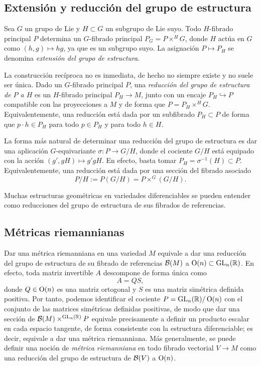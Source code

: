 \documentclass[11pt,a4paper]{amsbook}
\theoremstyle{remark} \newtheorem{rmk}[subsection]{Observación}
\theoremstyle{definition} \newtheorem{defn}[subsection]{Definición}
\theoremstyle{definition} \newtheorem{ex}[subsection]{Ejemplo}
\theoremstyle{definition} \newtheorem{ej}[subsection]{Ejercicio}
\begin{document}
\subsection{Extensión y reducción del grupo de estructura} Sea $G$ un grupo de Lie y $H\subset G$ un subgrupo de Lie suyo. Todo $H$-fibrado principal $P$ determina un $G$-fibrado principal $P_G=P\times^H G$, donde $H$ actúa en $G$ como $(h,g)\mapsto hg$, ya que es un subgrupo suyo. La asignación $P\mapsto P_H$ se denomina \emph{extensión del grupo de estructura}.

La construcción recíproca no es inmediata, de hecho no siempre existe y no suele ser única. Dado un $G$-fibrado principal $P$, una \emph{reducción del grupo de estructura de $P$ a $H$} es un $H$-fibrado principal $P_H\rightarrow M$, junto con un encaje $P_H\hookrightarrow P$ compatible con las proyecciones a $M$ y de forma que $P=P_H\times^H G$.
Equivalentemente, una reducción está dada por un subfibrado $P_H\subset P$ de forma que $p\cdot h \in P_H$ para todo $p\in P_H$ y para todo $h\in H$.

La forma más natural de determinar una reducción del grupo de estructura es dar una aplicación $G$-equivariante $\sigma: P \rightarrow G/H$, donde el cociente $G/H$ está equipado con la acción $(g', gH) \mapsto g'gH$. En efecto, basta tomar $P_H=\sigma^{-1}(H)\subset P$. Equivalentemente, una reducción está dada por una sección del fibrado asociado
\begin{equation*}
P/H := P(G/H) = P\times^G (G/H).
\end{equation*}


Muchas estructuras geométricas en variedades diferenciables se pueden entender como reducciones del grupo de estructura de sus fibrados de referencias.
\subsection{Métricas riemannianas} Dar una métrica riemanniana en una variedad $M$ equivale a dar una reducción del grupo de estructura de su fibrado de referencias $\mathcal B(M)$ a $\operatorname{O}(n)\subset \operatorname{GL}_n(\mathbb R)$. En efecto, toda matriz invertible $A$ descompone de forma única como
        \begin{equation*}
A= QS,
        \end{equation*}
        donde $Q\in \operatorname{O}(n)$ es una matriz ortogonal y $S$ es una matriz simétrica definida positiva. Por tanto, podemos identificar el cociente $P=\operatorname{GL}_n(\mathbb R)/\operatorname{O}(n)$ con el conjunto de las matrices simétricas definidas positivas, de modo que dar una sección de $\mathcal B(M)\times^{\operatorname{GL}_n(\mathbb R)} P$ equivale precisamente a definir un producto escalar en cada espacio tangente, de forma consistente con la estructura diferenciable; es decir, equivale a dar una métrica riemanniana.
Más generalmente, se puede definir una noción de \emph{métrica riemanniana} en todo fibrado vectorial $V\rightarrow M$ como una reducción del grupo de estructura de $\mathcal B(V)$ a $\operatorname{O}(n)$.
\end{document}
